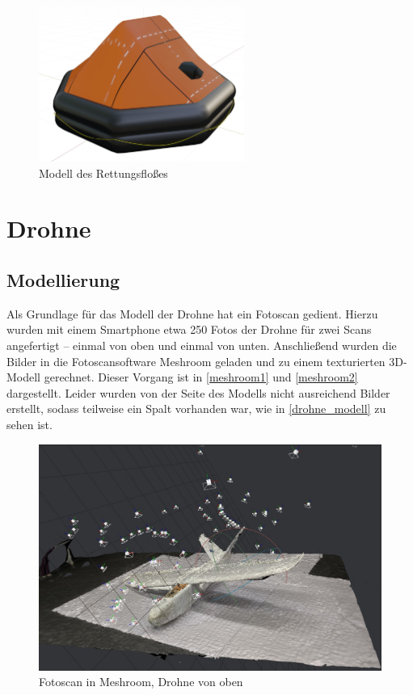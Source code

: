 \begin{figure}[H]
\begin{center}
\includegraphics[width=0.6\textwidth]{gfx/prod/boat/liferaft1.jpg}
\caption{Modell des Rettungsfloßes}
\label{liferaft1}
\end{center}
\end{figure}

\section{Drohne}

\subsection{Modellierung}

Als Grundlage für das Modell der Drohne hat ein Fotoscan gedient. Hierzu wurden mit einem Smartphone etwa 250 Fotos der Drohne für zwei Scans angefertigt -- einmal von oben und einmal von unten. Anschließend wurden die Bilder in die Fotoscansoftware Meshroom geladen und zu einem texturierten 3D-Modell gerechnet. Dieser Vorgang ist in \autoref{meshroom1} und \autoref{meshroom2} dargestellt. Leider wurden von der Seite des Modells nicht ausreichend Bilder erstellt, sodass teilweise ein Spalt vorhanden war, wie in \autoref{drohne_modell} zu sehen ist.\\

\begin{figure}[H]
\begin{center}
\includegraphics[width=\textwidth]{gfx/prod/plane/meshroom2.jpg}
\caption{Fotoscan in Meshroom, Drohne von oben}
\label{meshroom1}
\end{center}
\end{figure}

